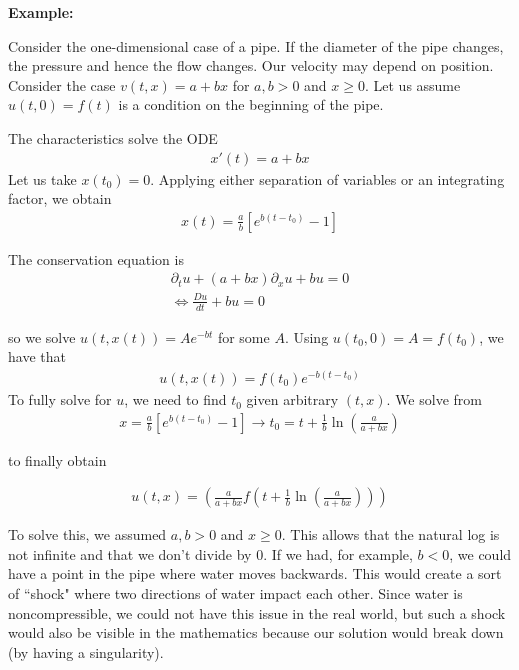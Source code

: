 \documentclass{article}
\newcommand{\pd}{\partial}
\begin{document}
	\vspace{0.25 cm}
	
	\textbf{Example:}
	
	Consider the one-dimensional case of a pipe. If the diameter of the pipe changes, the pressure and hence the flow changes. Our velocity may depend on position. Consider the case $v(t,x) = a+bx$ for $a,b>0$ and $x \geq 0$. Let us assume $u(t,0) = f(t)$ is a condition on the beginning of the pipe. 
	
	The characteristics solve the ODE 
	\begin{align*}
		x'(t) = a+bx
	\end{align*}
	Let us take $x(t_0) = 0$. Applying either separation of variables or an integrating factor, we obtain 
	\begin{align*}
		x(t) = \frac{a}{b} \left[ e^{b(t-t_0)}-1\right]
	\end{align*}
	
	The conservation equation is 
	\begin{align*}
		\pd_{t} u + (a+bx) \pd_{x}u + bu = 0 \\
		\Leftrightarrow \frac{Du}{dt} + bu = 0
	\end{align*}
	
	so we solve $u(t,x(t)) = Ae^{-bt}$ for some $A$. Using $u(t_0,0) = A = f(t_0)$, we have that 
	\begin{align*}
		u(t,x(t)) = f(t_0)e^{-b(t-t_0)}
	\end{align*}
	To fully solve for $u$, we need to find $t_0$ given arbitrary $(t,x)$. We solve from 
	\begin{align*}
		x = \frac{a}{b} \left[ e^{b(t-t_0)}-1\right] \to t_0 = t + \frac{1}{b} \ln(\frac{a}{a+bx})
	\end{align*}
	
	to finally obtain 
	
	\begin{align*}
		u(t,x) = \left(\frac{a}{a+bx} f \left(t + \frac{1}{b} \ln \left(\frac{a}{a+bx} \right)\right) \right) 
	\end{align*}
	
	To solve this, we assumed $a,b > 0$ and $x \geq 0$. This allows that the natural log is not infinite and that we don't divide by $0$. If we had, for example, $b < 0$, we could have a point in the pipe where water moves backwards. This would create a sort of ``shock" where two directions of water impact each other. Since water is noncompressible, we could not have this issue in the real world, but such a shock would also be visible in the mathematics because our solution would break down (by having a singularity). 
	
\end{document}
